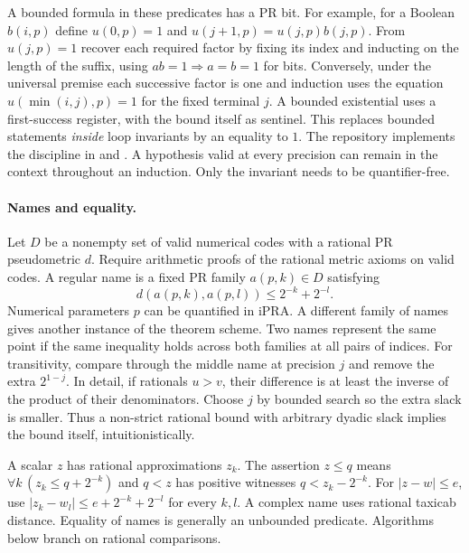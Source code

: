 A bounded formula in these predicates has a PR bit. For example, for a Boolean $b(i,p)$ define $u(0,p)=1$ and $u(j+1,p)=u(j,p)b(j,p)$. From $u(j,p)=1$ recover each required factor by fixing its index and inducting on the length of the suffix, using $ab=1\Rightarrow a=b=1$ for bits. Conversely, under the universal premise each successive factor is one and induction uses the equation $u(\min(i,j),p)=1$ for the fixed terminal $j$. A bounded existential uses a first-success register, with the bound itself as sentinel. This replaces bounded statements \emph{inside} loop invariants by an equality to $1$. The repository implements the discipline in  and . A hypothesis valid at every precision can remain in the context throughout an induction. Only the invariant needs to be quantifier-free.

\paragraph{Names and equality.}
Let $D$ be a nonempty set of valid numerical codes with a rational PR pseudometric $d$. Require arithmetic proofs of the rational metric axioms on valid codes. A regular name is a fixed PR family $a(p,k)\in D$ satisfying
\[
 d(a(p,k),a(p,l))\le 2^{-k}+2^{-l}.
\]
Numerical parameters $p$ can be quantified in iPRA. A different family of names gives another instance of the theorem scheme. Two names represent the same point if the same inequality holds across both families at all pairs of indices. For transitivity, compare through the middle name at precision $j$ and remove the extra $2^{1-j}$. In detail, if rationals $u>v$, their difference is at least the inverse of the product of their denominators. Choose $j$ by bounded search so the extra slack is smaller. Thus a non-strict rational bound with arbitrary dyadic slack implies the bound itself, intuitionistically.

A scalar $z$ has rational approximations $z_k$. The assertion $z\le q$ means $\forall k\,(z_k\le q+2^{-k})$ and $q<z$ has positive witnesses $q<z_k-2^{-k}$. For $|z-w|\le e$, use $|z_k-w_l|\le e+2^{-k}+2^{-l}$ for every $k,l$. A complex name uses rational taxicab distance. Equality of names is generally an unbounded predicate. Algorithms below branch on rational comparisons.

